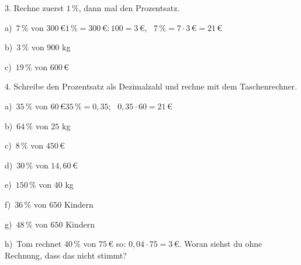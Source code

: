\documentclass[11pt]{article}
\newcommand{\grau}[1]{{\color{mbgrau}#1}}
\begin{document}
\begin{pfaufg}{}{3.}{}
Rechne zuerst $1\,\%$, dann mal den Prozentsatz.\par\medskip
\grau{a)\ $7\,\%$ von $300\,€$\quad $1\,\% = 300\,€ : 100 = 3\,€$, \ $7\,\% = 7 \cdot 3\,€ = 21\,€$}\par\medskip
\noindent\begin{minipage}[t]{0.48\linewidth}
b)\ $3\,\%$ von $900$ kg
\end{minipage}\hfill
\begin{minipage}[t]{0.48\linewidth}
c)\ $19\,\%$ von $600\,€$
\end{minipage}
\end{pfaufg}

\begin{pfaufg}{}{4.}{}
Schreibe den Prozentsatz als Dezimalzahl und rechne mit dem Taschenrechner.\par\medskip
\grau{a)\ $35\,\%$ von $60\,€$\quad $35\,\% = 0{,}35$; \ $0{,}35 \cdot 60 = 21\,€$}\par\medskip
\noindent\begin{minipage}[t]{0.48\linewidth}
b)\ $64\,\%$ von $25$ kg
\end{minipage}\hfill
\begin{minipage}[t]{0.48\linewidth}
c)\ $8\,\%$ von $450\,€$
\end{minipage}
\noindent\begin{minipage}[t]{0.48\linewidth}
d)\ $30\,\%$ von $14{,}60\,€$
\end{minipage}\hfill
\begin{minipage}[t]{0.48\linewidth}
e)\ $150\,\%$ von $40$ kg
\end{minipage}
\noindent\begin{minipage}[t]{0.48\linewidth}
f)\ $36\,\%$ von $650$ Kindern
\end{minipage}\hfill
\begin{minipage}[t]{0.48\linewidth}
g)\ $48\,\%$ von $650$ Kindern
\end{minipage}
\noindent\begin{minipage}[t]{0.48\linewidth}
h)\ Tom rechnet $40\,\%$ von $75\,€$ so: $0{,}04 \cdot 75 = 3\,€$. Woran siehst du ohne Rechnung, dass das nicht stimmt?
\end{minipage}
\end{pfaufg}
\end{document}
